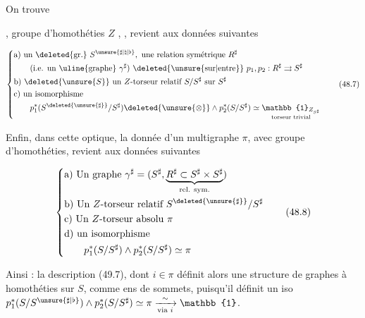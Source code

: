 On trouve

,  groupe d'homothéties $Z$ , ,  revient  aux données  suivantes

\[
\left\{\begin{aligned}
&\text{a) un \deleted{gr.} }S^{\unsure{\sharp|\natural|\flat}},\ \text{une relation symétrique }R^\sharp\\
&\qquad\text{(i.e. un \uline{graphe} }\gamma^\sharp\text{) }\deleted{\unsure{\mathrm{sur}|\mathrm{entre}}}\ p_1,p_2:R^\sharp\rightrightarrows S^\sharp\\
&\text{b) }\deleted{\unsure{S}}\ \text{un }Z\text{-torseur relatif }S/S^\sharp\text{ sur }S^\sharp\\
&\text{c) un isomorphisme}\\
&\qquad p_1^*(S^{\deleted{\unsure{\sharp}}}/S^\sharp)\deleted{\unsure{\otimes}}\mathbin{\wedge}p_2^*(S/S^\sharp)\simeq\underset{\text{torseur trivial}}{\mathbb{1}_{Z_{S^\sharp}}}
\end{aligned}\right.
\tag*{(48.7)}
\]


Enfin, dans cette optique, la donnée d'un multigraphe $\pi$,  avec groupe d'homothéties, revient aux données suivantes

\[
\left\{\begin{aligned}
&\text{a) Un graphe }\gamma^\sharp=(S^\sharp,\underbrace{R^\sharp\subset S^\sharp\times S^\sharp}_{\text{rel. sym.}})\\
&\text{b) Un }Z\text{-torseur relatif }S^{\deleted{\unsure{\sharp}}}/S^\sharp\\
&\text{c) Un }Z\text{-torseur absolu }\pi\\
&\text{d) un isomorphisme}\\
&\qquad p_1^*(S/S^\sharp)\wedge p_2^*(S/S^\sharp)\simeq\pi
\end{aligned}\right.
\tag*{(48.8)}
\]

Ainsi : la description (49.7), dont $i\in\pi$ définit alors une structure de graphes à homothéties sur $S$, comme ens de sommets, puisqu'il définit un iso $p_1^*(S/S^{\unsure{\sharp|\flat}})\wedge p_2^*(S/S^\sharp)\simeq\pi\xrightarrow[\text{via }i]{\sim}\mathbb{1}$.

